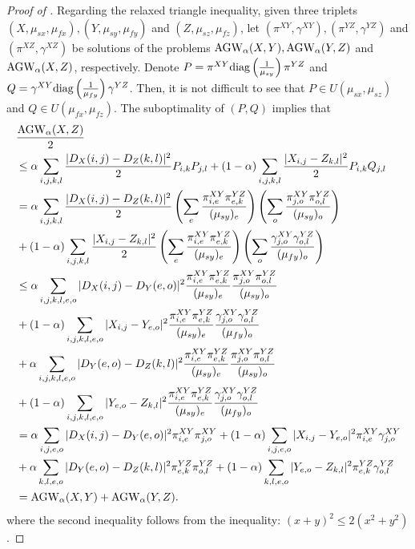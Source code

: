 \begin{proof}[Proof of ]
  Regarding the relaxed triangle inequality, given three triplets
  $(X, \mu_{sx}, \mu_{fx}), (Y, \mu_{sy}, \mu_{fy})$ and $(Z, \mu_{sz}, \mu_{fz})$,
  let $(\pi^{XY}, \gamma^{XY}), (\pi^{YZ}, \gamma^{YZ})$ and $(\pi^{XZ}, \gamma^{XZ})$
  be solutions of the problems $\text{AGW}_{\alpha}(X, Y), \text{AGW}_{\alpha}(Y, Z)$ and
  $\text{AGW}_{\alpha}(X, Z)$, respectively. Denote
  $P = \pi^{XY} \text{diag} \left( \frac{1}{\mu_{sy}} \right) \pi^{YZ}$ and
  $Q = \gamma^{XY} \text{diag} \left( \frac{1}{\mu_{fy}} \right) \gamma^{YZ}$. Then,
  it is not difficult to see that $P \in U(\mu_{sx}, \mu_{sz})$ and
  $Q \in U(\mu_{fx}, \mu_{fz})$. The suboptimality of $(P,Q)$ implies that
  \begin{align}
      &\frac{\text{AGW}_{\alpha}(X, Z)}{2} \\
      &\leq \alpha \sum_{i,j,k,l} \frac{|D_X(i,j) - D_Z(k,l)|^2}{2} P_{i,k} P_{j, l}
      + (1 - \alpha) \sum_{i,j,k,l} \frac{|X_{i,j} - Z_{k,l}|^2}{2} P_{i,k} Q_{j,l} \\
      &= \alpha \sum_{i,j,k,l} \frac{|D_X(i,j) - D_Z(k,l)|^2}{2}
      \left( \sum_e \frac{\pi^{XY}_{i,e} \pi^{YZ}_{e,k}}{(\mu_{sy})_e} \right)
      \left(\sum_o \frac{\pi^{XY}_{j,o} \pi^{YZ}_{o,l}}{(\mu_{sy})_o} \right) \\
      &+ (1 - \alpha) \sum_{i,j,k,l} \frac{|X_{i,j} - Z_{k,l}|^2}{2}
      \left(\sum_e \frac{\pi^{XY}_{i,e} \pi^{YZ}_{e,k}}{(\mu_{sy})_e} \right)
      \left( \sum_o \frac{\gamma^{XY}_{j,o} \gamma^{YZ}_{o,l}}{(\mu_{fy})_o} \right) \\
      &\leq \alpha \sum_{i,j,k,l,e,o} |D_X(i,j) - D_Y(e,o)|^2
      \frac{\pi^{XY}_{i,e} \pi^{YZ}_{e,k}}{(\mu_{sy})_e}
      \frac{\pi^{XY}_{j,o} \pi^{YZ}_{o,l}}{(\mu_{sy})_o} \\
      &+ (1 - \alpha) \sum_{i,j,k,l,e,o} |X_{i,j} - Y_{e,o}|^2
      \frac{\pi^{XY}_{i,e} \pi^{YZ}_{e,k}}{(\mu_{sy})_e}
      \frac{\gamma^{XY}_{j,o} \gamma^{YZ}_{o,l}}{(\mu_{fy})_o} \\
      &+ \alpha \sum_{i,j,k,l,e,o} |D_Y(e, o) - D_Z(k,l)|^2
      \frac{\pi^{XY}_{i,e} \pi^{YZ}_{e,k}}{(\mu_{sy})_e}
      \frac{\pi^{XY}_{j,o} \pi^{YZ}_{o,l}}{(\mu_{sy})_o} \\
      &+ (1 - \alpha) \sum_{i,j,k,l,e,o} |Y_{e, o} - Z_{k,l}|^2
      \frac{\pi^{XY}_{i,e} \pi^{YZ}_{e,k}}{(\mu_{sy})_e}
      \frac{\gamma^{XY}_{j,o} \gamma^{YZ}_{o,l}}{(\mu_{fy})_o} \\
      &= \alpha \sum_{i,j,e,o} |D_X(i,j) - D_Y(e,o)|^2 \pi^{XY}_{i,e} \pi^{XY}_{j,o}
      + (1 - \alpha) \sum_{i,j,e,o} |X_{i,j} - Y_{e,o}|^2 \pi^{XY}_{i,e} \gamma^{XY}_{j,o} \\
      &+ \alpha \sum_{k, l, e, o} |D_Y(e, o) - D_Z(k,l)|^2 \pi^{YZ}_{e,k} \pi^{YZ}_{o,l}
      + (1 - \alpha) \sum_{k,l,e,o} |Y_{e, o} - Z_{k,l}|^2 \pi^{YZ}_{e,k} \gamma^{YZ}_{o,l} \\
      &= \text{AGW}_{\alpha}(X, Y) + \text{AGW}_{\alpha}(Y, Z).
  \end{align}
  where the second inequality follows from the inequality: $(x + y)^2 \leq 2(x^2 + y^2)$.
\end{proof}

